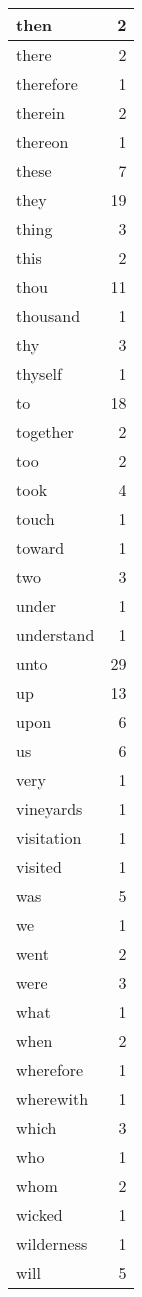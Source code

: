 \begin{center}
\begin{longtable}{l|r}
then & 2 \\ \hline
there & 2 \\ \hline
therefore & 1 \\ \hline
therein & 2 \\ \hline
thereon & 1 \\ \hline
these & 7 \\ \hline
they & 19 \\ \hline
thing & 3 \\ \hline
this & 2 \\ \hline
thou & 11 \\ \hline
thousand & 1 \\ \hline
thy & 3 \\ \hline
thyself & 1 \\ \hline
to & 18 \\ \hline
together & 2 \\ \hline
too & 2 \\ \hline
took & 4 \\ \hline
touch & 1 \\ \hline
toward & 1 \\ \hline
two & 3 \\ \hline
under & 1 \\ \hline
understand & 1 \\ \hline
unto & 29 \\ \hline
up & 13 \\ \hline
upon & 6 \\ \hline
us & 6 \\ \hline
very & 1 \\ \hline
vineyards & 1 \\ \hline
visitation & 1 \\ \hline
visited & 1 \\ \hline
was & 5 \\ \hline
we & 1 \\ \hline
went & 2 \\ \hline
were & 3 \\ \hline
what & 1 \\ \hline
when & 2 \\ \hline
wherefore & 1 \\ \hline
wherewith & 1 \\ \hline
which & 3 \\ \hline
who & 1 \\ \hline
whom & 2 \\ \hline
wicked & 1 \\ \hline
wilderness & 1 \\ \hline
will & 5 \\ \hline

\end{longtable}
\end{center}
